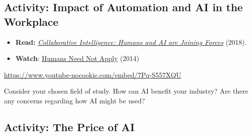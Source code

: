 \documentclass[
  letterpaper,
  DIV=11,
  numbers=noendperiod]{scrreprt}
\providecommand{\tightlist}{%
  \setlength{\itemsep}{0pt}\setlength{\parskip}{0pt}}\usepackage{longtable,booktabs,array}
\begin{document}
\subsection{Activity: Impact of Automation and AI in the
Workplace}\label{activity-impact-of-automation-and-ai-in-the-workplace}

\begin{tcolorbox}[enhanced jigsaw, toprule=.15mm, colback=white, colframe=quarto-callout-note-color-frame, bottomtitle=1mm, leftrule=.75mm, coltitle=black, titlerule=0mm, rightrule=.15mm, colbacktitle=quarto-callout-note-color!10!white, left=2mm, title={Learning Activity}, opacitybacktitle=0.6, opacityback=0, breakable, toptitle=1mm, arc=.35mm, bottomrule=.15mm]

\begin{itemize}
\tightlist
\item
  \textbf{Read:}
  \href{https://www.youtube.com/watch?v=7Pq-S557XQU}{\emph{Collaborative
  Intelligence: Humans and AI are Joining Forces}} (2018).
\item
  \textbf{Watch}:
  \href{https://www.youtube.com/watch?v=7Pq-S557XQU}{Humans Need Not
  Apply} (2014)
\end{itemize}

\url{https://www.youtube-nocookie.com/embed/7Pq-S557XQU}

Consider your chosen field of study. How can AI benefit your industry?
Are there any concerns regarding how AI might be used?

\end{tcolorbox}

\subsection{Activity: The Price of AI}\label{activity-the-price-of-ai}
\end{document}
